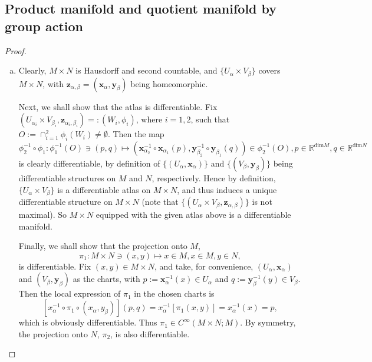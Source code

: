 
{

\subsection{Product manifold and quotient manifold by group action}

\newcommand*{\x}{\mathbf{x}}
\newcommand*{\y}{\mathbf{y}}
\newcommand*{\z}{\mathbf{z}}
\newcommand*{\iso}[1]{\stackrel{\mathrm{#1.}}{\cong}}

\begin{proof}
\begin{enumerate}[(a)]
	\item
	Clearly, $M \times N$ is Hausdorff and second countable, and $\{U_\alpha \times V_\beta\}$ covers $M \times N$, with $\z_{\alpha,\beta}=(\x_\alpha,\y_\beta)$ being homeomorphic.
	\par
	Next, we shall show that the atlas is differentiable. Fix $(U_{\alpha_i} \times V_{\beta_i}, \z_{\alpha_i,\beta_i}) =: (W_i,\phi_i)$, where $i=1,2$, such that $O := \cap_{i=1}^2 \phi_i(W_i) \ne \emptyset$. Then the map
	\[\phi_2^{-1} \circ \phi_1: \phi_1^{-1}(O) \ni (p,q) \mapsto \left(\x_{\alpha_2}^{-1} \circ \x_{\alpha_1}(p), \y_{\beta_2}^{-1} \circ \y_{\beta_1}(q)\right) \in \phi_2^{-1}(O), p\in\mathbb{R}^{\mathrm{dim }M}, q\in\mathbb{R}^{\mathrm{dim }N}\]
	is clearly differentiable, by definition of $\{(U_\alpha,\x_\alpha)\}$ and $\{(V_\beta,\y_\beta)\}$ being differentiable structures on $M$ and $N$, respectively. Hence by definition, $\{U_\alpha \times V_\beta\}$ is a differentiable atlas on $M \times N$, and thus induces a unique differentiable structure on $M \times N$ (note that $\{(U_\alpha \times V_\beta,\z_{\alpha,\beta})\}$ is not maximal). So $M \times N$ equipped with the given atlas above is a differentiable manifold.
	\par
	Finally, we shall show that the projection onto $M$, 
	\[\pi_1: M \times N \ni (x,y) \mapsto x \in M, x \in M, y \in N,\]
	is differentiable. Fix $(x,y) \in M \times N$, and take, for convenience, $(U_\alpha, \x_\alpha)$ and $(V_\beta, \y_\beta)$ as the charts, with $p:= \x_\alpha^{-1}(x) \in U_\alpha$ and $q:= \y_\beta^{-1}(y) \in V_\beta$. Then the local expression of $\pi_1$ in the chosen charts is 
	\[ \left[x_\alpha^{-1} \circ \pi_1 \circ (x_\alpha, y_\beta)\right](p,q) = x_\alpha^{-1}[\pi_1(x,y)] = x_\alpha^{-1}(x) = p,\]
	which is obviously differentiable. Thus $\pi_1 \in C^\infty(M \times N; M)$.	By symmetry, the projection onto $N$, $\pi_2$, is also differentiable.
	

\end{enumerate}
\end{proof}}
